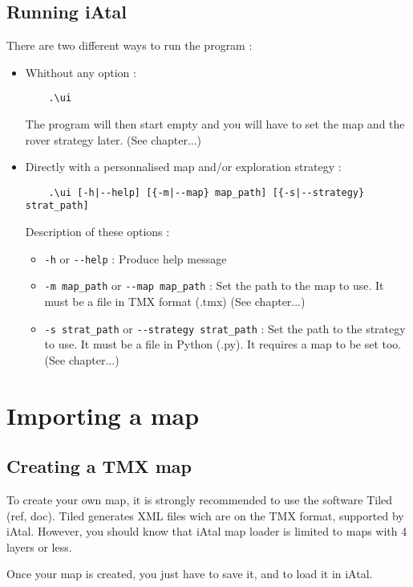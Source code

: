 \documentclass[a4paper,11pt]{article}
\begin{document}
\subsection{Running iAtal}
There are two different ways to run the program :
\begin{itemize}
\item Whithout any option :
\begin{verbatim}
	.\ui
\end{verbatim}
  The program will then start empty and you will have to set the map
  and the rover strategy later. (See chapter...)
  
\item Directly with a personnalised map and/or exploration strategy :
\begin{verbatim}
	.\ui [-h|--help] [{-m|--map} map_path] [{-s|--strategy} strat_path]
\end{verbatim}
  Description of these options :
  \begin{itemize}
  \item \verb!-h! or \verb!--help! : Produce help message
  \item \verb!-m map_path! or \verb!--map map_path! : Set the path to
    the map to use. It must be a file in TMX format (.tmx) (See
    chapter...)
  \item \verb!-s strat_path! or \verb!--strategy strat_path! : Set the
    path to the strategy to use. It must be a file in Python (.py). It
    requires a map to be set too. (See chapter...)
  \end{itemize}
\end{itemize}

\section{Importing a map}

\subsection{Creating a TMX map}

To create your own map, it is strongly recommended to use the software
Tiled (ref, doc).  Tiled generates XML files wich are on the TMX
format, supported by iAtal. However, you should know that iAtal map
loader is limited to maps with 4 layers or less.

Once your map is created, you just have to save it, and to load it in
iAtal.
\end{document}
